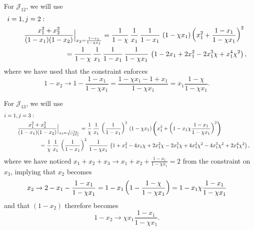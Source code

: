For \(\mathcal{J}_{12}\), we will use
\begin{align}
    i=1,&\,j=2:\notag
    \\
    \label{eq:constrained_integrand_12}
    &\frac{x_1^2 + x_2^2}{(1-x_1)(1-x_2)}
    \Big|_{x_2 = \frac{1-x_1}{1-\chi x_1}}
    =
    \frac{1}{1-\chi}\,
    \frac{1}{x_1}\,
    \frac{1}{1-x_1}\,
    \le(1 - \chi x_1\ri)
    \le(x_1^2 + \frac{1 - x_1}{1 - \chi x_1}\ri)^2
    \\
    &
    \qquad\qquad\qquad
    =
    \frac{1}{1-\chi}\,
    \frac{1}{x_1}\,
    \frac{1}{1-x_1}\,
    \frac{1}{1 - \chi x_1}\,
    \le(
        1 - 2 x_1 + 2 x_1^2 - 2 x_1^3 \chi + x_1^4 \chi^2
    \ri)
    \notag
    ,
\end{align}
where we have used that the constraint enforces
\begin{equation}
    1 - x_2
    \to
    1 - \frac{1-x_1}{1 - \chi x_1}
    =
    \frac{1 - \chi x_1 - 1 + x_1}{1 - \chi x_1}
    =
    x_1\frac{1-\chi}{1 - \chi x_1}
    .
\end{equation}

For \(\mathcal{J}_{13}\), we will use
%
\begin{align}
    i=1,&\,j=3:\notag
    \\
    \label{eq:constrained_integrand_13}
    &\frac{x_1^2 + x_2^2}{(1-x_1)(1-x_2)}
    \Big|_{x_3 = \frac{1-x_1}{1-\chi x_1}}
    =
    \frac{1}{\chi}\,
    \frac{1}{x_1}\,
    \le(\frac{1}{1-x_1}\ri)^2\,
    \le(1 - \chi x_1\ri)
    \le(
        x_1^2 + \le(1 - x_1 \chi \frac{1-x_1}{1 - \chi x_1}\ri)^2
    \ri)
    \\
    &
    \qquad\qquad
    =
    \frac{1}{\chi}\,
    \frac{1}{x_1}\,
    \le(\frac{1}{1-x_1}\ri)^2\,
    \frac{1}{1 - \chi x_1}\,
    \le(
        1 + x_1^2 - 4 x_1 \chi + 2 x_1^2 \chi - 2 x_1^3 \chi + 4 x_1^2 \chi^2 - 4 x_1^3 \chi^2 + 2 x_1^4 \chi^2
    \ri)
    \notag
    ,
\end{align}
where we have noticed \(
    x_1 + x_2 + x_3
    \to
    x_1 + x_2 + \frac{1-x_1}{1-\chi x_1}
    =
    2
\) from the constraint on \(x_3\), implying that \(x_2\) becomes
\begin{equation}
    x_2 \to 2 - x_1 - \frac{1-x_1}{1-\chi x_1}
    =
    1 - x_1 \left(
        1 - \frac{1-\chi}{1 - \chi x_1}
    \right)
    =
    1 - x_1 \chi \frac{1-x_1}{1 - \chi x_1}
\end{equation}
and that \((1-x_2)\) therefore becomes
\begin{equation}
    1 - x_2
    \to
    \chi x_1 \frac{1 - x_1}{1 - \chi x_1}
    .
\end{equation}


